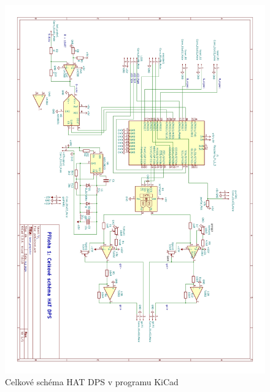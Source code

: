 \documentclass{template/socthesis}
\begin{document}
\begin{figure}[H]
  \centering
  \includegraphics[width=\paperwidth]{img/pcb-schem-full.jpg}
  \caption{\label{fig:pcb-schematic-full} Celkové schéma HAT DPS v programu KiCad}
\end{figure}
\end{document}
